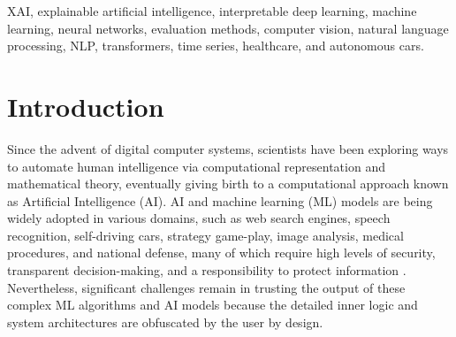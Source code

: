 \documentclass[final,5p,times,twocolumn]{elsarticle}
\begin{document}
\begin{frontmatter}
\begin{abstract}
Artificial intelligence models encounter significant challenges due to their black-box nature, particularly in safety-critical domains such as healthcare, finance, and autonomous vehicles. Explainable Artificial Intelligence (XAI) addresses these challenges by providing explanations for how these models make decisions and predictions, ensuring transparency, accountability, and fairness. Existing studies have examined the fundamental concepts of XAI, its general principles, and the scope of XAI techniques. However, there remains a gap in the literature as there are no comprehensive reviews that delve into the detailed mathematical representations, design methodologies of XAI models, and other associated aspects. This paper provides a comprehensive literature review encompassing common terminologies and definitions, the need for XAI, beneficiaries of XAI, a taxonomy of XAI methods, and the application of XAI methods in different application areas. The survey is aimed at XAI researchers, XAI practitioners, AI model developers, and XAI beneficiaries who are interested in enhancing the trustworthiness, transparency, accountability, and fairness of their AI models.

\end{abstract}


\begin{keyword}
XAI, explainable artificial intelligence, interpretable deep learning, machine learning, neural networks, evaluation methods, computer vision, natural language processing, NLP, transformers, time series, healthcare, and autonomous cars.


\end{keyword}

\end{frontmatter}



\section{Introduction}
\label{sec:introduction}
Since the advent of digital computer systems, scientists have been exploring ways to automate human intelligence via computational representation and mathematical theory, eventually giving birth to a computational approach known as Artificial Intelligence (AI). AI and machine learning (ML) models are being widely adopted in various domains, such as web search engines, speech recognition, self-driving cars, strategy game-play, image analysis, medical procedures, and national defense, many of which require high levels of security, transparent decision-making, and a responsibility to protect information \cite{weller2019transparency,samek2017explainable}. Nevertheless, significant challenges remain in trusting the output of these complex ML algorithms and AI models because the detailed inner logic and system architectures are obfuscated by the user by design.
\end{document}
